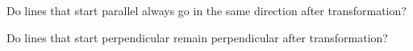 Do lines that start parallel always go in the same direction after transformation?  



Do lines that start perpendicular remain perpendicular after transformation? 


\edXsolution{  }

\endedxproblem

\endedxvertical










